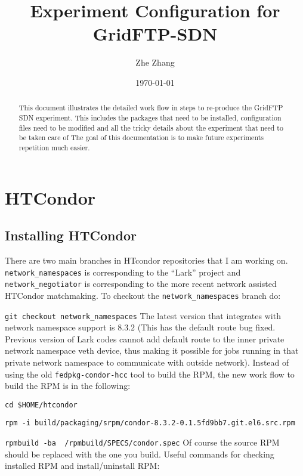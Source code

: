 \documentclass[a4paper]{article}
\title{Experiment Configuration for GridFTP-SDN}
\author{Zhe Zhang}
\date{\today}
\begin{document}
\maketitle

\begin{abstract}
This document illustrates the detailed work flow in steps to re-produce the GridFTP SDN experiment. This includes the packages that need to be installed, configuration files need to be modified and all the tricky details about the experiment that need to be taken care of The goal of this documentation is to make future experiments repetition much easier.
\end{abstract}

\section{HTCondor}
\subsection{Installing HTCondor}
There are two main branches in HTcondor repositories that I am working on. {\tt network\_namespaces} is corresponding to the ``Lark'' project and {\tt network\_negotiator} is corresponding to the more recent network assisted HTCondor matchmaking.\newline \newline
To checkout the {\tt network\_namespaces} branch do: 

{\tt git checkout network\_namespaces}\newline \newline
The latest version that integrates with network namespace support is $8.3.2$ (This has the default route bug fixed. Previous version of Lark codes cannot add default route to the inner private network namespace veth device, thus making it possible for jobs running in that private network namespace to communicate with outside network). Instead of using the old {\tt fedpkg-condor-hcc} tool to build the RPM, the new work flow to build the RPM is in the following:

{\tt cd \$HOME/htcondor}

{\tt rpm -i build/packaging/srpm/condor-8.3.2-0.1.5fd9bb7.git.el6.src.rpm}

{\tt rpmbuild -ba ~/rpmbuild/SPECS/condor.spec}\newline \newline
Of course the source RPM should be replaced with the one you build. Useful commands for checking installed RPM and install/uninstall RPM:
\end{document}
